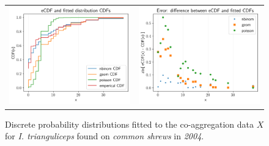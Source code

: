 \documentclass{article}
\begin{document}
\begin{figure}[]
	\begin{mdframed}[backgroundcolor=grey250,rightline=false,leftline=false,topline=false]
	\centering
	\begin{tabular}{ll}
		\includegraphics[width=.48\linewidth,valign=m]{CDF_compare_2004_I.trianguliceps_SA} & \includegraphics[width=.48\linewidth,valign=m]{CDF_errors_2004_I.trianguliceps_SA}
	\end{tabular}
	\caption{Discrete probability distributions fitted to the co-aggregation data $ X $ for \textit{I. trianguliceps} found on \textit{common shrews} in \textit{2004}.}
	\label{fig:CDF_2004_itrianguliceps_SA}
	\end{mdframed}
\end{figure}
\end{document}
